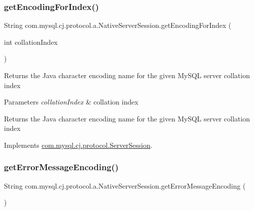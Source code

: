 \subsubsection{\texorpdfstring{get\+Encoding\+For\+Index()}{getEncodingForIndex()}}
{\footnotesize\ttfamily String com.\+mysql.\+cj.\+protocol.\+a.\+Native\+Server\+Session.\+get\+Encoding\+For\+Index (\begin{DoxyParamCaption}\item[{int}]{collation\+Index }\end{DoxyParamCaption})}

Returns the Java character encoding name for the given My\+S\+QL server collation index


\begin{DoxyParams}{Parameters}
{\em collation\+Index} & collation index \\
\hline
\end{DoxyParams}
\begin{DoxyReturn}{Returns}
the Java character encoding name for the given My\+S\+QL server collation index 
\end{DoxyReturn}


Implements \mbox{\hyperlink{interfacecom_1_1mysql_1_1cj_1_1protocol_1_1_server_session_a437ab4e5fb2cdd6cc66f206bce8688cd}{com.\+mysql.\+cj.\+protocol.\+Server\+Session}}.

\mbox{\label{classcom_1_1mysql_1_1cj_1_1protocol_1_1a_1_1_native_server_session_aea6f38295ee9c65cfc59d975b20539ff}} 
\subsubsection{\texorpdfstring{get\+Error\+Message\+Encoding()}{getErrorMessageEncoding()}}
{\footnotesize\ttfamily String com.\+mysql.\+cj.\+protocol.\+a.\+Native\+Server\+Session.\+get\+Error\+Message\+Encoding (\begin{DoxyParamCaption}{ }\end{DoxyParamCaption})}



